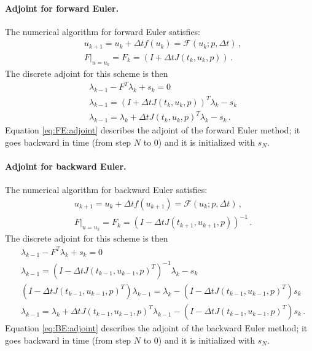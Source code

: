 \documentclass[10pt]{article}
\newcommand{\dt}{\Delta t}
\newcommand{\param}{p}
\newcommand{\ModelN}{{\mathcal{F}}}
\newcommand{\ModelTLM}{F}
\begin{document}
\paragraph{Adjoint for forward Euler.} The numerical algorithm for
forward Euler satisfies:
%
\begin{align}
  \label{eq:FE}
  &u_{k+1}=u_k + \dt f(u_k)= \ModelN(u_k;\param,\dt)\,,\\
  \nonumber
  &\left. \ModelTLM \right|_{u=u_k} =\ModelTLM_k = (I + \dt
  J(t_k,u_k,\param))\,.
\end{align}
%
The discrete adjoint for this scheme is then
%
\begin{align}
\nonumber
&\lambda_{k-1}   -  \ModelTLM^T \lambda_k + s_k =0
\\
\nonumber
&\lambda_{k-1} = \left(I + \dt J(t_{k},u_{k},\param) \right)^T \lambda_k -
s_k
\\
\label{eq:FE:adjoint}
&\lambda_{k-1} =  \lambda_k + \dt J(t_k,u_k,\param)^T \lambda_k - s_k\,.
\end{align}
%
Equation \eqref{eq:FE:adjoint} describes the adjoint of the forward
Euler method; it goes backward in time (from step $N$ to $0$) and it
is initialized with $s_N$.


\paragraph{Adjoint for backward Euler.} The numerical algorithm for
backward Euler satisfies:
%
\begin{align}
  \label{eq:BE}
  &u_{k+1}=u_k + \dt f(u_{k+1})= \ModelN(u_k;\param,\dt)\,,\\
  \nonumber
  &\left. \ModelTLM \right|_{u=u_k} =\ModelTLM_k = \left(I - \dt
  J(t_{k+1},u_{k+1},\param)\right)^{-1}\,.
\end{align}
%
The discrete adjoint for this scheme is then
%
\begin{align}
\nonumber
&\lambda_{k-1}   -  \ModelTLM^T \lambda_k + s_k =0
\\
\nonumber
&\lambda_{k-1} = \left(I - \dt J(t_{k-1},u_{k-1},\param)^T \right)^{-1} \lambda_k -
s_k
\\
\nonumber
&\left(I - \dt J(t_{k-1},u_{k-1},\param)^T \right) \lambda_{k-1} = \lambda_k -
\left(I - \dt J(t_{k-1},u_{k-1},\param)^T \right) s_k\\
\label{eq:BE:adjoint}
& \lambda_{k-1} = \lambda_k + \dt J(t_{k-1},u_{k-1},\param)^T
\lambda_{k-1} -
\left(I - \dt J(t_{k-1},u_{k-1},\param)^T \right) s_k\,.
\end{align}
%
Equation \eqref{eq:BE:adjoint} describes the adjoint of the backward
Euler method; it goes backward in time (from step $N$ to $0$) and it
is initialized with $s_N$.
\end{document}
